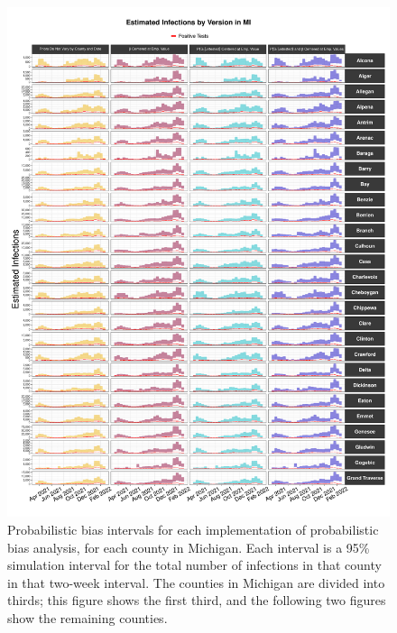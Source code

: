 \documentclass[12pt,twoside]{smiththesis}
\begin{document}
\begin{figure}

{\centering \includegraphics[width=1\linewidth]{figure/mi1_pb_compared_to_observed} 

}

\caption{\label{fig:pb_versions_mi-1} Probabilistic bias intervals for each implementation of probabilistic bias analysis, for each county in Michigan. Each interval is a 95\% simulation interval for the total number of infections in that county in that two-week interval. The counties in Michigan are divided into thirds; this figure shows the first third, and the following two figures show the remaining counties.}\label{fig:unnamed-chunk-112}
\end{figure}
\end{document}
